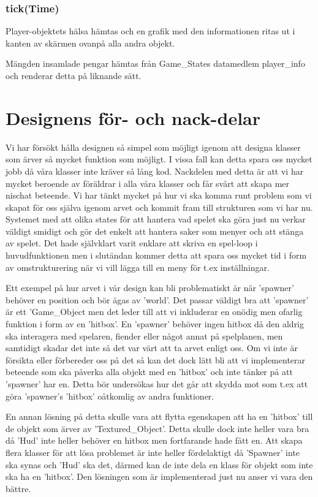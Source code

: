 \documentclass{TDP005mall}
\begin{document}
\subsubsection{tick(Time)}
Player-objektets hälsa hämtas och en grafik med den informationen ritas ut i kanten av skärmen ovanpå alla andra objekt.

Mängden insamlade pengar hämtas från Game\_States datamedlem player\_info och renderar detta på liknande sätt. 

\section{Designens för- och nack-delar}
Vi har försökt hålla designen så simpel som möjligt igenom att designa klasser som ärver så mycket funktion som möjligt. I vissa fall kan detta spara oss mycket jobb då våra klasser inte kräver så lång kod. Nackdelen med detta är att vi har mycket beroende av föräldrar i alla våra klasser och får svårt att skapa mer nischat beteende. Vi har tänkt mycket på hur vi ska komma runt problem som vi skapat för oss själva igenom arvet och kommit fram till strukturen som vi har nu. Systemet med att olika states för att hantera vad spelet ska göra just nu verkar väldigt smidigt och gör det enkelt att hantera saker som menyer och att stänga av spelet. Det hade självklart varit enklare att skriva en spel-loop i huvudfunktionen men i slutändan kommer detta att spara oss mycket tid i form av omstrukturering när vi vill lägga till en meny för t.ex inställningar.

Ett exempel på hur arvet i vår design kan bli problematiskt är när 'spawner' behöver en position och bör ägas av 'world'. Det passar väldigt bra att 'spawner' är ett 'Game\_Object men det leder till att vi inkluderar en onödig men ofarlig funktion i form av en 'hitbox'. En 'spawner' behöver ingen hitbox då den aldrig ska interagera med spelaren, fiender eller något annat på spelplanen, men samtidigt skadar det inte så det var värt att ta arvet enligt oss. Om vi inte är försikta eller förbereder oss på det så kan det dock lätt bli att vi implementerar beteende som ska påverka alla objekt med en 'hitbox' och inte tänker på att 'spawner' har en. Detta bör undersökas hur det går att skydda mot som t.ex att göra 'spawner's 'hitbox' oåtkomlig av andra funktioner.

En annan lösning på detta skulle vara att flytta egenskapen att ha en 'hitbox' till de objekt som ärver av 'Textured\_Object'. Detta skulle dock inte heller vara bra då 'Hud' inte heller behöver en hitbox men fortfarande hade fått en. Att skapa flera klasser för att lösa problemet är inte heller fördelaktigt då 'Spawner' inte ska synas och 'Hud' ska det, därmed kan de inte dela en klass för objekt som inte ska ha en 'hitbox'. Den lösningen som är implementerad just nu anser vi vara den bättre.
\end{document}
